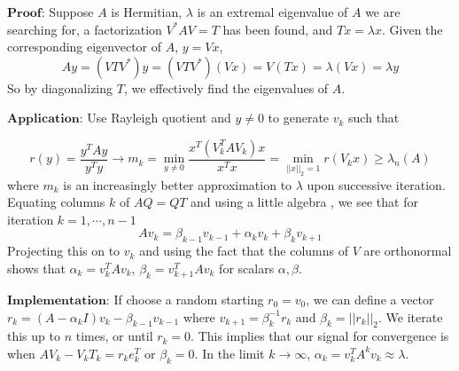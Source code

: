 \documentclass[a4paper,12pt]{article}
\begin{document}
$\textbf{Proof}$: Suppose $A$ is Hermitian, $\lambda$ is an extremal eigenvalue of $A$ we are searching for, a factorization $V^*AV=T$ has been found, and $Tx = \lambda x$. Given the corresponding eigenvector of $A$, $y=Vx$,
\begin{equation}
Ay=(VTV^*)y=(VTV^*)(Vx)=V(Tx)=\lambda(V x) = \lambda y
\end{equation}
So by diagonalizing $T$, we effectively find the eigenvalues of $A$.

\newpage

$\textbf{Application}$: Use Rayleigh quotient and $y\neq0$ to generate $v_k$ such that

\begin{equation}
r(y)=\frac{y^TAy}{y^Ty} \rightarrow m_k = \min_{y\neq0} \frac{x^T(V_k^TAV_k)x}{x^Tx} = \min_{||x||_2=1} r(V_k x) \geq \lambda_n(A)
\end{equation}
where $m_k$ is an increasingly better approximation to $\lambda$ upon successive iteration.
Equating columns $k$ of $AQ=QT$ and using a little algebra , we see that for iteration $k=1,\cdots,n-1$
\begin{equation}
Av_k=\beta_{k-1}v_{k-1} + \alpha_k v_k +\beta_k v_{k+1}
\end{equation}
Projecting this on to $v_k$ and using the fact that the columns of $V$ are orthonormal shows that $\alpha_k =v_k^T Av_k$, $\beta_k=v_{k+1}^TAv_k$ for scalars $\alpha,\beta$. 

\newpage

$\textbf{Implementation}$: If choose a random starting $r_0=v_0$, we can define a vector $r_k=(A-\alpha_k I)v_k-\beta_{k-1}v_{k-1}$ where $v_{k+1}=\beta_k^{-1}r_k$ and $\beta_k =||r_k||_2$. We iterate this  up to $n$ times, or until $r_k=0$. This implies that our signal for convergence is when $AV_k -V_kT_k = r_k e_k^T$ or $\beta_k =0$. In the limit $k\rightarrow \infty$, $\alpha_k=v_k^T A^k v_k \approx \lambda $.
\end{document}
